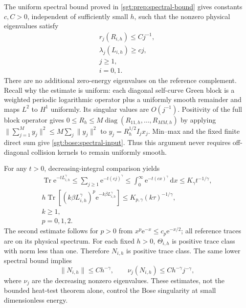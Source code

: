 \documentclass[aps,pra,reprint,superscriptaddress,longbibliography]{revtex4-2}
\newcommand{\Tr}{\operatorname{Tr}}
\newcommand{\dd}{\mathrm d}
\newcommand{\ee}{\mathrm e}
\begin{document}
The uniform spectral bound proved in
\eqref{sgt:prep:spectral-bound} gives constants $c,C>0$, independent of sufficiently
small $h$, such that the nonzero physical eigenvalues satisfy
\begin{equation}
\begin{gathered}
 r_j(R_{i,h})\le Cj^{-1},\\
 \lambda_j(L_{i,h})\ge cj,\\
 j\ge1,\\
 i=0,1.
 \label{sgt:bose:spectral-input}
\end{gathered}
\end{equation}
There are no additional zero-energy eigenvalues on the reference
complement.  Recall why the estimate is uniform: each diagonal self-curve
Green block is a weighted periodic logarithmic operator plus a uniformly
smooth remainder and maps $L^2$ to $H^1$ uniformly.  Its singular values
are $O(j^{-1})$.  Positivity of the full block operator gives
$0\le R_h\le M\operatorname{diag}(R_{11,h},\ldots,R_{MM,h})$ by applying
$\|\sum_{j=1}^M y_j\|^2\le M\sum_j\|y_j\|^2$ to
$y_j=R_h^{1/2}I_jx_j$.  Min--max and the fixed finite direct sum give
\eqref{sgt:bose:spectral-input}.  Thus this argument never requires
off-diagonal collision kernels to remain uniformly smooth.

For any $t>0$, decreasing-integral comparison yields
\begin{gather}
 \Tr\ee^{-tL_{i,h}^{\gamma}}
 \le\sum_{j\ge1}\ee^{-t(cj)^\gamma}
 \le\int_0^\infty\ee^{-t(cx)^\gamma}\,\dd x
 \le K_\gamma t^{-1/\gamma},
 \label{sgt:bose:heat-bound}\\
 h\Tr\!\left[(k\beta L_{i,h}^{\gamma})^p
                 \ee^{-k\beta L_{i,h}^{\gamma}}\right]
 \le K_{p,\gamma}(k\tau)^{-1/\gamma},
 \\
 k\ge1,\\
 p=0,1,2.
 \label{sgt:bose:weighted-bound}
\end{gather}
The second estimate follows for $p>0$ from
$x^p\ee^{-x}\le c_p\ee^{-x/2}$; all reference traces are on its
physical spectrum.  For each fixed $h>0$, $\Theta_{i,h}$ is positive
trace class with norm less than one.  Therefore $N_{i,h}$ is positive
trace class.  The same lower spectral bound implies
\begin{equation}
 \|N_{i,h}\|\le C h^{-\gamma},\qquad
 \nu_j(N_{i,h})\le C h^{-\gamma}j^{-\gamma},
 \label{sgt:bose:occupation-bound}
\end{equation}
where $\nu_j$ are the decreasing nonzero eigenvalues.  These estimates,
not the bounded heat-test theorem alone, control the Bose singularity
at small dimensionless energy.
\end{document}
